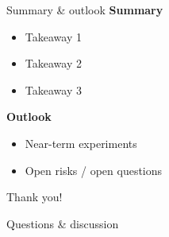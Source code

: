 
\begin{frame}{Summary \& outlook}
  \textbf{Summary}
  \begin{itemize}
    \item Takeaway 1
    \item Takeaway 2
    \item Takeaway 3
  \end{itemize}
  \vspace{0.6em}
  \textbf{Outlook}
  \begin{itemize}
    \item Near-term experiments
    \item Open risks / open questions
  \end{itemize}
  \vfill
  \centering
  {\Large Thank you!\par}
  {\normalsize Questions \& discussion\par}
\end{frame}
